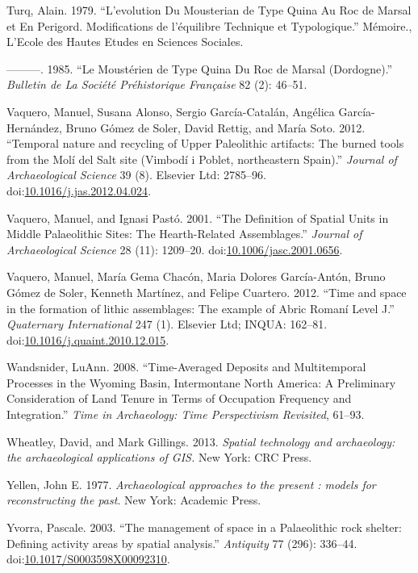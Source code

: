 \documentclass[smallextended]{svjour3}       %
\begin{document}
\hypertarget{ref-turq_evolution_1979}{}
Turq, Alain. 1979. ``L'evolution Du Mousterian de Type Quina Au Roc de
Marsal et En Perigord. Modifications de l'équilibre Technique et
Typologique.'' Mémoire., L'Ecole des Hautes Etudes en Sciences Sociales.

\hypertarget{ref-turq_mousterien_1985}{}
---------. 1985. ``Le Moustérien de Type Quina Du Roc de Marsal
(Dordogne).'' \emph{Bulletin de La Société Préhistorique Française} 82
(2): 46--51.

\hypertarget{ref-Vaquero2012}{}
Vaquero, Manuel, Susana Alonso, Sergio García-Catalán, Angélica
García-Hernández, Bruno Gómez de Soler, David Rettig, and María Soto.
2012. ``Temporal nature and recycling of Upper Paleolithic artifacts:
The burned tools from the Molí del Salt site (Vimbodí i Poblet,
northeastern Spain).'' \emph{Journal of Archaeological Science} 39 (8).
Elsevier Ltd: 2785--96.
doi:\href{https://doi.org/10.1016/j.jas.2012.04.024}{10.1016/j.jas.2012.04.024}.

\hypertarget{ref-Vaquero2001}{}
Vaquero, Manuel, and Ignasi Pastó. 2001. ``The Definition of Spatial
Units in Middle Palaeolithic Sites: The Hearth-Related Assemblages.''
\emph{Journal of Archaeological Science} 28 (11): 1209--20.
doi:\href{https://doi.org/10.1006/jasc.2001.0656}{10.1006/jasc.2001.0656}.

\hypertarget{ref-Vaquero2012a}{}
Vaquero, Manuel, María Gema Chacón, Maria Dolores García-Antón, Bruno
Gómez de Soler, Kenneth Martínez, and Felipe Cuartero. 2012. ``Time and
space in the formation of lithic assemblages: The example of Abric
Romaní Level J.'' \emph{Quaternary International} 247 (1). Elsevier Ltd;
INQUA: 162--81.
doi:\href{https://doi.org/10.1016/j.quaint.2010.12.015}{10.1016/j.quaint.2010.12.015}.

\hypertarget{ref-Wandsnider2008}{}
Wandsnider, LuAnn. 2008. ``Time-Averaged Deposits and Multitemporal
Processes in the Wyoming Basin, Intermontane North America: A
Preliminary Consideration of Land Tenure in Terms of Occupation
Frequency and Integration.'' \emph{Time in Archaeology: Time
Perspectivism Revisited}, 61--93.

\hypertarget{ref-Wheatley}{}
Wheatley, David, and Mark Gillings. 2013. \emph{Spatial technology and
archaeology: the archaeological applications of GIS.} New York: CRC
Press.

\hypertarget{ref-Yellen1977}{}
Yellen, John E. 1977. \emph{Archaeological approaches to the present :
models for reconstructing the past}. New York: Academic Press.

\hypertarget{ref-Yvorra2003}{}
Yvorra, Pascale. 2003. ``The management of space in a Palaeolithic rock
shelter: Defining activity areas by spatial analysis.'' \emph{Antiquity}
77 (296): 336--44.
doi:\href{https://doi.org/10.1017/S0003598X00092310}{10.1017/S0003598X00092310}.



\end{document}
